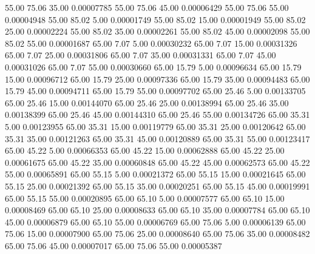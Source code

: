      55.00     75.06     35.00     0.00007785
     55.00     75.06     45.00     0.00006429
     55.00     75.06     55.00     0.00004948
     55.00     85.02      5.00     0.00001749
     55.00     85.02     15.00     0.00001949
     55.00     85.02     25.00     0.00002224
     55.00     85.02     35.00     0.00002261
     55.00     85.02     45.00     0.00002098
     55.00     85.02     55.00     0.00001687
     65.00      7.07      5.00     0.00030232
     65.00      7.07     15.00     0.00031326
     65.00      7.07     25.00     0.00031806
     65.00      7.07     35.00     0.00031331
     65.00      7.07     45.00     0.00031026
     65.00      7.07     55.00     0.00030660
     65.00     15.79      5.00     0.00096634
     65.00     15.79     15.00     0.00096712
     65.00     15.79     25.00     0.00097336
     65.00     15.79     35.00     0.00094483
     65.00     15.79     45.00     0.00094711
     65.00     15.79     55.00     0.00097702
     65.00     25.46      5.00     0.00133705
     65.00     25.46     15.00     0.00144070
     65.00     25.46     25.00     0.00138994
     65.00     25.46     35.00     0.00138399
     65.00     25.46     45.00     0.00144310
     65.00     25.46     55.00     0.00134726
     65.00     35.31      5.00     0.00123955
     65.00     35.31     15.00     0.00119779
     65.00     35.31     25.00     0.00120642
     65.00     35.31     35.00     0.00121263
     65.00     35.31     45.00     0.00120889
     65.00     35.31     55.00     0.00123417
     65.00     45.22      5.00     0.00066353
     65.00     45.22     15.00     0.00062888
     65.00     45.22     25.00     0.00061675
     65.00     45.22     35.00     0.00060848
     65.00     45.22     45.00     0.00062573
     65.00     45.22     55.00     0.00065891
     65.00     55.15      5.00     0.00021372
     65.00     55.15     15.00     0.00021645
     65.00     55.15     25.00     0.00021392
     65.00     55.15     35.00     0.00020251
     65.00     55.15     45.00     0.00019991
     65.00     55.15     55.00     0.00020895
     65.00     65.10      5.00     0.00007577
     65.00     65.10     15.00     0.00008469
     65.00     65.10     25.00     0.00008633
     65.00     65.10     35.00     0.00007784
     65.00     65.10     45.00     0.00006879
     65.00     65.10     55.00     0.00006769
     65.00     75.06      5.00     0.00006139
     65.00     75.06     15.00     0.00007900
     65.00     75.06     25.00     0.00008640
     65.00     75.06     35.00     0.00008482
     65.00     75.06     45.00     0.00007017
     65.00     75.06     55.00     0.00005387
